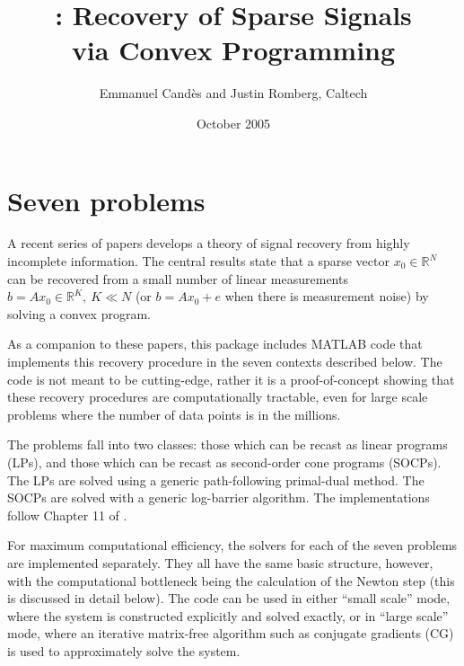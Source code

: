 \documentclass{article}
\title{\packname: Recovery of Sparse Signals\\ via Convex Programming}
\author{Emmanuel Cand\`es and Justin Romberg, Caltech}
\date{October 2005}
\newcommand{\R}{\mathbb{R}}
\newcommand{\<}{\langle}
\renewcommand{\>}{\rangle}
\begin{document}
\maketitle

\section{Seven problems}

A recent series of papers 
\cite{candes04ro,candes04ne,candes05qu,candes05st,candes05da,candes05de} develops a theory of signal recovery from highly incomplete information.  The central results state that a sparse vector $x_0\in\R^N$ can be recovered from a small number of linear measurements $b=Ax_0\in\R^K,~K\ll N$ (or $b=Ax_0+e$ when there is measurement noise) by solving a convex program.  

As a companion to these papers, this package includes MATLAB code that implements this recovery procedure in the seven contexts described below.  The code is not meant to be cutting-edge, rather it is a proof-of-concept showing that these recovery procedures are computationally tractable, even for large scale problems where the number of data points is in the millions.  

The problems fall into two classes: those which can be recast as linear programs (LPs), and those which can be recast as second-order cone programs (SOCPs).  The LPs are solved using a generic path-following primal-dual method.  The SOCPs are solved with a generic log-barrier algorithm.  The implementations follow Chapter 11 of 
\cite{boyd04co}.

For maximum computational efficiency, the solvers for each of the seven problems are implemented separately.  They all have the same basic structure, however, with the computational bottleneck being the calculation of the Newton step (this is discussed in detail below).  The code can be used in either ``small scale'' mode, where the system is constructed explicitly and solved exactly, or in ``large scale'' mode, where an iterative matrix-free algorithm such as conjugate gradients (CG) is used to approximately solve the system.
 
\end{document}
